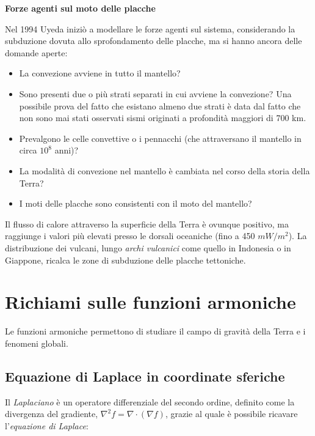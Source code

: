 \documentclass[a4paper,12pt]{book}
\begin{document}
\noindent \textbf{Forze agenti sul moto delle placche}

Nel 1994 Uyeda iniziò a modellare le forze agenti sul sistema, considerando la subduzione dovuta allo sprofondamento delle placche, ma si hanno ancora delle domande aperte:

\begin{itemize}
    \item La convezione avviene in tutto il mantello?
    \item Sono presenti due o più strati separati in cui avviene la convezione?
    Una possibile prova del fatto che esistano almeno due strati è data dal fatto che non sono mai stati osservati sismi originati a profondità maggiori di 700 km.
    \item Prevalgono le celle convettive o i pennacchi (che attraversano il mantello in circa $10^8$ anni)?
    \item La modalità di convezione nel mantello è cambiata nel corso della storia della Terra?
    \item I moti delle placche sono consistenti con il moto del mantello?
\end{itemize}

\noindent Il flusso di calore attraverso la superficie della Terra è ovunque positivo, ma raggiunge i valori più elevati presso le dorsali oceaniche (fino a 450 $mW/m^2$).
La distribuzione dei vulcani, lungo \textit{archi vulcanici} come quello in Indonesia o in Giappone, ricalca le zone di subduzione delle placche tettoniche.

\newpage

\section{\textcolor{colore7}{Richiami sulle funzioni armoniche}}

Le funzioni armoniche permettono di studiare il campo di gravità della Terra e i fenomeni globali.

\subsection{\textcolor{colore7}{Equazione di Laplace in coordinate sferiche}}

Il \textit{Laplaciano} è un operatore differenziale del secondo ordine, definito come la divergenza del gradiente, $\nabla^2 f = \nabla \cdot (\nabla f)$, grazie al quale è possibile ricavare l'\textit{equazione di Laplace}:
\end{document}
